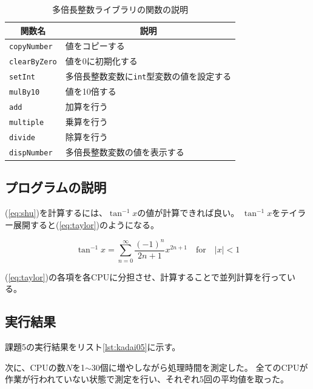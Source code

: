 \documentclass[a4j,titlepage]{jsarticle}
\newcommand{\chuo}[1]{\multicolumn{1}{|c|}{#1}}
\begin{document}


\begin{table}[H]
  \centering
  \caption{多倍長整数ライブラリの関数の説明}
  \label{tb:multiple}

  \begin{tabular}{|l|l|}
    \hline
    \chuo{関数名} & \chuo{説明} \\ \hline \hline
    \texttt{copyNumber} & 値をコピーする \\ \hline
    \texttt{clearByZero} & 値を0に初期化する \\ \hline
    \texttt{setInt} & 多倍長整数変数に\texttt{int}型変数の値を設定する \\ \hline
    \texttt{mulBy10} & 値を10倍する \\ \hline
    \texttt{add} & 加算を行う \\ \hline
    \texttt{multiple} & 乗算を行う \\ \hline
    \texttt{divide} & 除算を行う \\ \hline
    \texttt{dispNumber} & 多倍長整数変数の値を表示する \\ \hline
  \end{tabular}
\end{table}

\subsection{プログラムの説明}
(\ref{eq:shu})を計算するには、$\tan^{-1} x$の値が計算できれば良い。
$\tan^{-1} x$をテイラー展開すると(\ref{eq:taylor})のようになる。

\begin{equation}
  \tan^{-1} x = \sum^{\infty}_{n = 0} \frac{(-1)^n}{2n + 1} x^{2n + 1} \quad \mathrm{for} \quad |x| < 1
  \label{eq:taylor}
\end{equation}

(\ref{eq:taylor})の各項を各CPUに分担させ、計算することで並列計算を行っている。

\subsection{実行結果}
課題5の実行結果をリスト\ref{lst:kadai05}に示す。



次に、CPUの数$N$を1$\sim$30個に増やしながら処理時間を測定した。
全てのCPUが作業が行われていない状態で測定を行い、それぞれ5回の平均値を取った。
\end{document}
